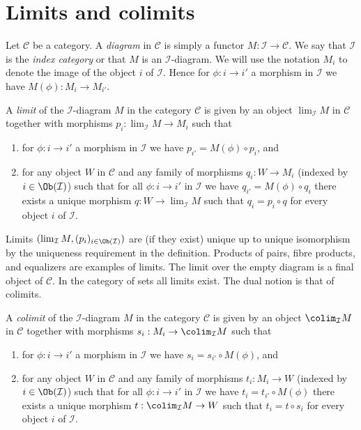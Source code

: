 \section{Limits and colimits}
\label{section-limits}

\noindent
Let $\mathcal{C}$ be a category. A {\it diagram} in $\mathcal{C}$ is
simply a functor $M : \mathcal{I} \to \mathcal{C}$. We say that
$\mathcal{I}$ is the {\it index category} or that $M$ is an
$\mathcal{I}$-diagram. We will use the notation $M_i$ to denote the
image of the object
$i$ of $\mathcal{I}$. Hence for $\phi : i \to i'$ a morphism
in $\mathcal{I}$ we have $M(\phi) : M_i \to M_{i'}$.

\begin{definition}
\label{definition-limit}
A {\it limit} of the $\mathcal{I}$-diagram $M$ in the category
$\mathcal{C}$ is given by an object $\lim_\mathcal{I} M$ in $\mathcal{C}$
together with morphisms $p_i : \lim_\mathcal{I} M \to M_i$ such that
\begin{enumerate}
\item for $\phi : i \to i'$ a morphism
in $\mathcal{I}$ we have $p_{i'} = M(\phi) \circ p_i$, and
\item for any object $W$ in $\mathcal{C}$ and any family of
morphisms $q_i : W \to M_i$ (indexed by $i \in \Ob(\mathcal{I})$)
such that for all $\phi : i \to i'$
in $\mathcal{I}$ we have $q_{i'} = M(\phi) \circ q_i$ there
exists a unique morphism $q : W \to \lim_\mathcal{I} M$ such that
$q_i = p_i \circ q$ for every object $i$ of $\mathcal{I}$.
\end{enumerate}
\end{definition}

\noindent
Limits $(\lim_\mathcal{I} M, (p_i)_{i\in \Ob(\mathcal{I})})$ are
(if they exist)
unique up to unique isomorphism by the uniqueness requirement
in the definition. Products of pairs, fibre products, and equalizers are
examples of limits. The limit over the empty diagram is a final object
of $\mathcal{C}$.
In the category of sets all limits exist.
The dual notion is that of colimits.

\begin{definition}
\label{definition-colimit}
A {\it colimit} of the $\mathcal{I}$-diagram $M$ in the category
$\mathcal{C}$ is given by an object $\colim_\mathcal{I} M$ in $\mathcal{C}$
together with morphisms $s_i : M_i \to \colim_\mathcal{I} M$ such that
\begin{enumerate}
\item for $\phi : i \to i'$ a morphism
in $\mathcal{I}$ we have $s_i = s_{i'} \circ M(\phi)$, and
\item for any object $W$ in $\mathcal{C}$ and any family of
morphisms $t_i : M_i \to W$ (indexed by $i \in \Ob(\mathcal{I})$)
such that for all $\phi : i \to i'$
in $\mathcal{I}$ we have $t_i = t_{i'} \circ M(\phi)$ there
exists a unique morphism $t : \colim_\mathcal{I} M \to W$ such that
$t_i = t \circ s_i$ for every object $i$ of $\mathcal{I}$.
\end{enumerate}
\end{definition}

